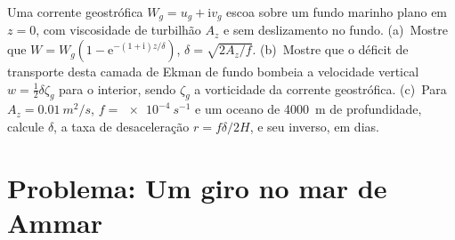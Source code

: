\begin{exercise}[$\star\star\star$]\label{exo:b3:ocean-dynamics:12}
Uma corrente geostrófica $W_g = u_g + \mathrm iv_g$ escoa sobre um fundo marinho plano
em $z = 0$, com viscosidade de turbilhão $A_z$ e sem deslizamento no fundo.
(a)~Mostre que $W = W_g(1 - \mathrm e^{-(1+\mathrm i)z/\delta})$, $\delta =
\sqrt{2A_z/f}$. (b)~Mostre que o déficit de transporte desta camada de Ekman
de fundo bombeia a velocidade vertical $w = \tfrac12\delta\zeta_g$ para o
interior, sendo $\zeta_g$ a vorticidade da corrente geostrófica. (c)~Para
$A_z = \qty{0.01}{m^2/s}$, $f = \qty{e-4}{s^{-1}}$ e um oceano
de \qty{4000}{m} de profundidade, calcule $\delta$, a taxa de desaceleração $r =
f\delta/2H$, e seu inverso, em dias.
\end{exercise}

\section{Problema: Um giro no mar de Ammar}

